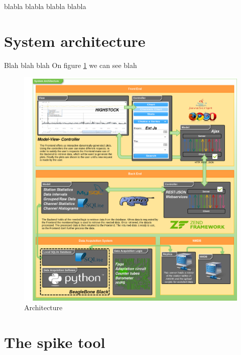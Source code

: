 \documentclass[a4paper]{jpconf}
\begin{document}
blabla \cite{Garcia2014}
blabla \cite{Medina2013}
blabla \cite{NMDB2011}
blabla \cite{Forbush1938}

\section{System architecture}


	Blah blah blah
	On figure \ref{fig:arch} we can see blah

	\begin{figure}[h]
		\centering
		\includegraphics[keepaspectratio, width=1\textwidth]{./resources/Architecture.png}
		\caption{Architecture}
		\label{fig:arch}
	\end{figure}

\section{The spike tool}

\end{document}
